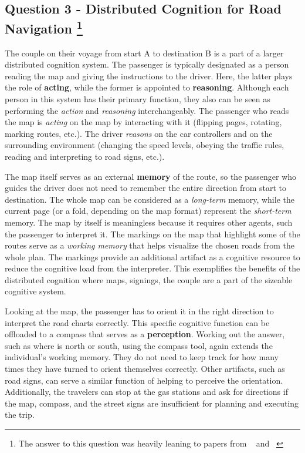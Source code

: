 \documentclass[12pt,letterpaper]{article}
\begin{document}
\subsection*{Question 3 - Distributed Cognition for Road Navigation \footnote{The answer to this question was heavily leaning to papers from ~\cite{hutchins1995cockpit} and ~\cite{nardi1996studying}}}

The couple on their voyage from start A to destination B is a part of a larger distributed cognition system. The passenger is typically designated as a person reading the map and giving the instructions to the driver. Here, the latter plays the role of \textbf{acting}, while the former is appointed to \textbf{reasoning}. Although each person in this system has their primary function, they also can be seen as performing the \textit{action} and \textit{reasoning} interchangeably. The passenger who reads the map is \textit{acting} on the map by interacting with it (flipping pages, rotating, marking routes, etc.). The driver \textit{reasons} on the car controllers and on the surrounding environment (changing the speed levels, obeying the traffic rules, reading and interpreting to road signs, etc.). 

The map itself serves as an external \textbf{memory} of the route, so the passenger who guides the driver does not need to remember the entire direction from start to destination. The whole map can be considered as a \textit{long-term} memory, while the current page (or a fold, depending on the map format) represent the \textit{short-term} memory. The map by itself is meaningless because it requires other agents, such the passenger to interpret it. The markings on the map that highlight some of the routes serve as a \textit{working memory} that helps visualize the chosen roads from the whole plan. The markings provide an additional artifact as a cognitive resource to reduce the cognitive load from the interpreter. This exemplifies the benefits of the distributed cognition where maps, signings, the couple are a part of the sizeable cognitive system. 

Looking at the map, the passenger has to orient it in the right direction to interpret the road charts correctly. This specific cognitive function can be offloaded to a compass that serves as a \textbf{perception}. Working out the answer, such as where is north or south, using the compass tool, again extends the individual's working memory. They do not need to keep track for how many times they have turned to orient themselves correctly. Other artifacts, such as road signs, can serve a similar function of helping to perceive the orientation. Additionally, the travelers can stop at the gas stations and ask for directions if the map, compass, and the street signs are insufficient for planning and executing the trip.
\end{document}
